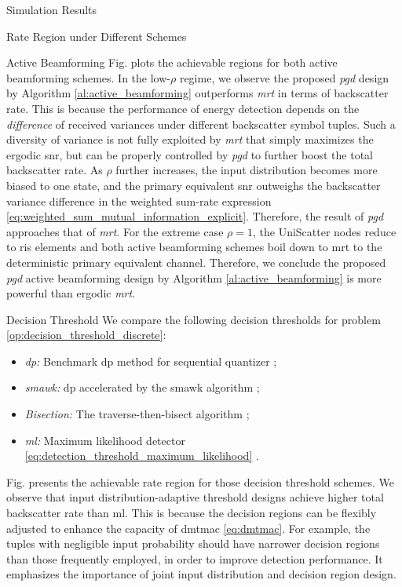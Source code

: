 \documentclass[journal]{IEEEtran}
\begin{document}
\begin{section}{Simulation Results}
\begin{subsection}{Rate Region under Different Schemes}
\begin{subsubsection}{Active Beamforming}
			Fig.  plots the achievable regions for both active beamforming schemes.
			In the low-$\rho$ regime, we observe the proposed \emph{\gls{pgd}} design by Algorithm \ref{al:active_beamforming} outperforms \emph{\gls{mrt}} in terms of backscatter rate.
			This is because the performance of energy detection depends on the \emph{difference} of received variances under different backscatter symbol tuples.
			Such a diversity of variance is not fully exploited by \emph{\gls{mrt}} that simply maximizes the ergodic \gls{snr}, but can be properly controlled by \emph{\gls{pgd}} to further boost the total backscatter rate.
			As $\rho$ further increases, the input distribution becomes more biased to one state, and the primary equivalent \gls{snr} outweighs the backscatter variance difference in the weighted sum-rate expression \eqref{eq:weighted_sum_mutual_information_explicit}.
			Therefore, the result of \emph{\gls{pgd}} approaches that of \emph{\gls{mrt}}.
			For the extreme case $\rho=1$, the UniScatter nodes reduce to \gls{ris} elements and both active beamforming schemes boil down to \gls{mrt} to the deterministic primary equivalent channel.
			Therefore, we conclude the proposed \emph{\gls{pgd}} active beamforming design by Algorithm \ref{al:active_beamforming} is more powerful than ergodic \emph{\gls{mrt}}.
		\end{subsubsection}

		\begin{subsubsection}{Decision Threshold}
			We compare the following decision thresholds for problem \eqref{op:decision_threshold_discrete}:
			\begin{itemize}
				\item \emph{\gls{dp}:} Benchmark \gls{dp} method for sequential quantizer \cite{He2021};
				\item \emph{\gls{smawk}:} \gls{dp} accelerated by the \gls{smawk} algorithm \cite{He2021};
				\item \emph{Bisection:} The traverse-then-bisect algorithm \cite{Nguyen2020a};
				\item \emph{\gls{ml}:} Maximum likelihood detector \eqref{eq:detection_threshold_maximum_likelihood} \cite{Qian2019}.
			\end{itemize}

			Fig.  presents the achievable rate region for those decision threshold schemes.
			We observe that input distribution-adaptive threshold designs achieve higher total backscatter rate than \gls{ml}.
			This is because the decision regions can be flexibly adjusted to enhance the capacity of \gls{dmtmac} \eqref{eq:dmtmac}.
			For example, the tuples with negligible input probability should have narrower decision regions than those frequently employed, in order to improve detection performance.
			It emphasizes the importance of joint input distribution and decision region design.
		\end{subsubsection}


\end{subsection}
\end{section}
\end{document}
